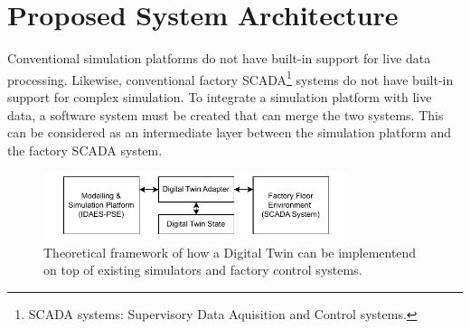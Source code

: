 \chapter{Proposed System Architecture}







Conventional simulation platforms do not have built-in support for live data processing. Likewise, conventional factory SCADA\footnote{SCADA systems: Supervisory Data Aquisition and Control systems.} systems do not have built-in support for complex simulation. To integrate a simulation platform with live data, a software system must be created that can merge the two systems. This can be considered as an intermediate layer between the simulation platform and the factory SCADA system.


\begin{figure}[h]
    \centering
    \includegraphics[width=0.8\textwidth]{research_article/research_journal_framework_simple.pdf}
    \caption{Theoretical framework of how a Digital Twin can be implementend on top of existing simulators and factory control systems.}
    \label{fig:theoretical_framework}
\end{figure}

